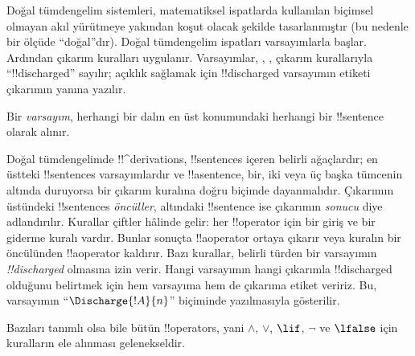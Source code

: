 

      {}
      {}


\begin{explain}
Doğal tümdengelim sistemleri, matematiksel ispatlarda kullanılan biçimsel
olmayan akıl yürütmeye yakından koşut olacak şekilde tasarlanmıştır (bu
nedenle bir ölçüde ``doğal''dır). Doğal tümdengelim ispatları varsayımlarla
başlar. Ardından çıkarım kuralları uygulanır. Varsayımlar, \Intro{\lnot},
\Intro{\lif},  çıkarım kurallarıyla ``!!{discharged}'' sayılır; açıklık sağlamak için
!!{discharged} varsayımın etiketi çıkarımın yanına yazılır.
\end{explain}

\begin{defn}[Varsayım]
Bir \emph{varsayım}, herhangi bir dalın en üst konumundaki herhangi bir
!!{sentence} olarak alınır.
\end{defn}

Doğal tümdengelimde !!^{derivation}s, !!{sentence}s içeren belirli ağaçlardır;
en üstteki !!{sentence}s varsayımlardır ve !!a{sentence}, bir, iki veya üç
başka tümcenin altında duruyorsa bir çıkarım kuralına doğru biçimde dayanmalıdır.
Çıkarımın üstündeki !!{sentence}s \emph{öncüller}, altındaki !!{sentence} ise
çıkarımın \emph{sonucu} diye adlandırılır. Kurallar çiftler hâlinde gelir: her
!!{operator} için bir giriş ve bir giderme kuralı vardır. Bunlar sonuçta
!!a{operator} ortaya çıkarır veya kuralın bir öncülünden !!a{operator}
kaldırır. Bazı kurallar, belirli türden bir varsayımın
\emph{!!{discharged}} olmasına izin verir. Hangi varsayımın hangi çıkarımla
!!{discharged} olduğunu belirtmek için hem varsayıma hem de çıkarıma etiket
veririz. Bu, varsayımın ``$\Discharge{!A}{n}$'' biçiminde yazılmasıyla
gösterilir.


%
	{Bazıları tanımlı olsa bile bütün !!{operator}s, yani $\land$, $\lor$,
  $\lif$, $\lnot$ ve $\lfalse$ için kuralların ele alınması gelenekseldir.}



